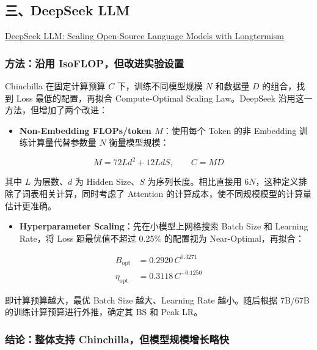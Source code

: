 \documentclass[
  11pt,
  a4paper,
  fontset=none]{ctexart}
\providecommand{\tightlist}{%
  \setlength{\itemsep}{0pt}\setlength{\parskip}{0pt}}
\begin{document}
\clearpage

\subsection{三、DeepSeek LLM}\label{ux4e09deepseek-llm}

\href{https://arxiv.org/abs/2401.02954}{DeepSeek LLM: Scaling
Open-Source Language Models with Longtermism}

\subsubsection{方法：沿用
IsoFLOP，但改进实验设置}\label{ux65b9ux6cd5ux6cbfux7528-isoflopux4f46ux6539ux8fdbux5b9eux9a8cux8bbeux7f6e}

Chinchilla 在固定计算预算 \(C\) 下，训练不同模型规模 \(N\) 和数据量
\(D\) 的组合，找到 Loss 最低的配置，再拟合 Compute-Optimal Scaling
Law。DeepSeek 沿用这一方法，但增加了两个改进：

\begin{itemize}
\tightlist
\item
  \textbf{Non-Embedding FLOPs/token \(M\)}：使用每个 Token 的非
  Embedding 训练计算量代替参数量 \(N\) 衡量模型规模：
\end{itemize}

\[M=72Ld^2+12LdS,\qquad C=MD\]

其中 \(L\) 为层数、\(d\) 为 Hidden Size、\(S\) 为序列长度。相比直接用
\(6N\)，这种定义排除了词表相关计算，同时考虑了 Attention
的计算成本，使不同规模模型的计算量估计更准确。

\begin{itemize}
\tightlist
\item
  \textbf{Hyperparameter Scaling}：先在小模型上网格搜索 Batch Size 和
  Learning Rate，将 Loss 距最优值不超过 0.25\% 的配置视为
  Near-Optimal，再拟合：
\end{itemize}

\[\boxed{
\begin{aligned}
B_{\mathrm{opt}}&=0.2920\,C^{0.3271}\\
\eta_{\mathrm{opt}}&=0.3118\,C^{-0.1250}
\end{aligned}}\]

即计算预算越大，最优 Batch Size 越大、Learning Rate 越小。随后根据
7B/67B 的训练计算预算进行外推，确定其 BS 和 Peak LR。

\subsubsection{结论：整体支持
Chinchilla，但模型规模增长略快}\label{ux7ed3ux8bbaux6574ux4f53ux652fux6301-chinchillaux4f46ux6a21ux578bux89c4ux6a21ux589eux957fux7565ux5feb}
\end{document}
